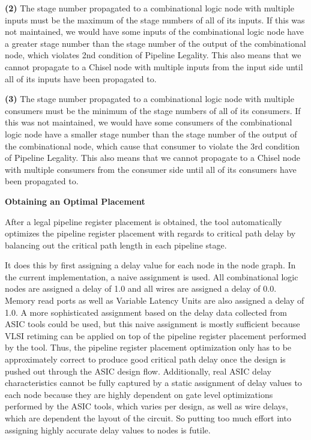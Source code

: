 {\bf (2)}  The stage number propagated to a combinational logic node with multiple inputs must be the maximum of the stage numbers of all of its inputs. If this was not maintained, we would have some inputs of the combinational logic node have a greater stage number than the stage number of the output of the combinational node, which violates 2nd condition of Pipeline Legality. This also means that we cannot propagate to a Chisel node with multiple inputs from the input side until all of its inputs have been propagated to.

{\bf (3)} The stage number propagated to a combinational logic node with multiple consumers must be the minimum of the stage numbers of all of its consumers. If this was not maintained, we would have some consumers of the combinational logic node have a smaller stage number than the stage number of the output of the combinational node, which cause that consumer to violate the 3rd condition of Pipeline Legality. This also means that we cannot propagate to a Chisel node with multiple consumers from the consumer side until all of its consumers have been propagated to.


{\bf Obtaining an Optimal Placement}

After a legal pipeline register placement is obtained, the tool automatically optimizes the pipeline register placement with regards to critical path delay by balancing out the critical path length in each pipeline stage. 

It does this by first assigning a delay value for each node in the node graph. In the current implementation, a naive assignment is used. All combinational logic nodes are assigned a delay of 1.0 and all wires are assigned a delay of 0.0. Memory read ports as well as Variable Latency Units are also assigned a delay of 1.0. A more sophisticated assignment based on the delay data collected from ASIC tools could be used, but this naive assignment is mostly sufficient because VLSI retiming can be applied on top of the pipeline register placement performed by the tool. Thus, the pipeline register placement optimization only has to be approximately correct to produce good critical path delay once the design is pushed out through the ASIC design flow. Additionally, real ASIC delay characteristics cannot be fully captured by a static assignment of delay values to each node because they are highly dependent on gate level optimizations performed by the ASIC tools, which varies per design, as well as wire delays, which are dependent the layout of the circuit. So putting too much effort into assigning highly accurate delay values to nodes is futile. 

